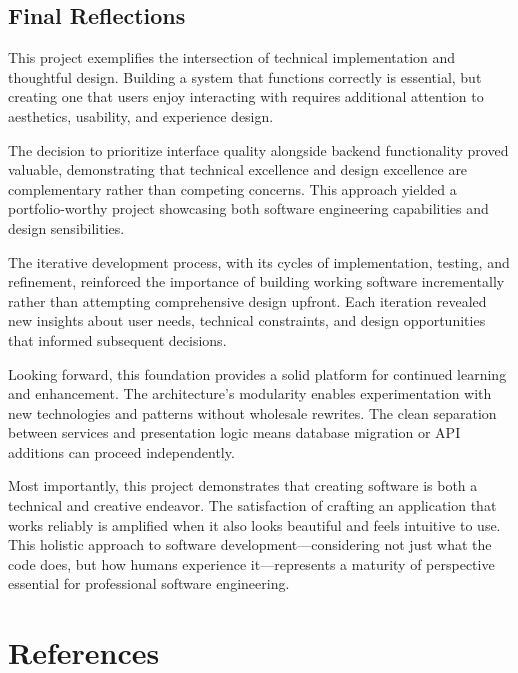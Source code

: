 \documentclass[12pt,a4paper]{article}
\begin{document}
\subsection{Final Reflections}

This project exemplifies the intersection of technical implementation and thoughtful design. Building a system that functions correctly is essential, but creating one that users enjoy interacting with requires additional attention to aesthetics, usability, and experience design.

The decision to prioritize interface quality alongside backend functionality proved valuable, demonstrating that technical excellence and design excellence are complementary rather than competing concerns. This approach yielded a portfolio-worthy project showcasing both software engineering capabilities and design sensibilities.

The iterative development process, with its cycles of implementation, testing, and refinement, reinforced the importance of building working software incrementally rather than attempting comprehensive design upfront. Each iteration revealed new insights about user needs, technical constraints, and design opportunities that informed subsequent decisions.

Looking forward, this foundation provides a solid platform for continued learning and enhancement. The architecture's modularity enables experimentation with new technologies and patterns without wholesale rewrites. The clean separation between services and presentation logic means database migration or API additions can proceed independently.

Most importantly, this project demonstrates that creating software is both a technical and creative endeavor. The satisfaction of crafting an application that works reliably is amplified when it also looks beautiful and feels intuitive to use. This holistic approach to software development—considering not just what the code does, but how humans experience it—represents a maturity of perspective essential for professional software engineering.

\newpage
\section*{References}
\end{document}
